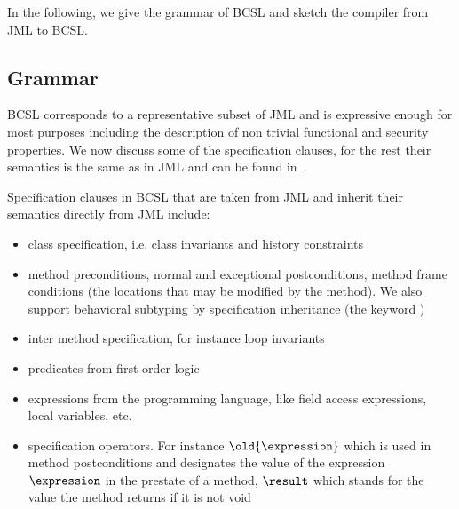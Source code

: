 In the following, we give the grammar of BCSL and sketch the compiler from JML to BCSL. 

\subsection{Grammar} \label{grammar}


BCSL corresponds to a representative subset of JML and is expressive enough for most purposes including the description of non trivial functional and 
 security properties. We now discuss some of the specification clauses, for the rest their semantics is the same as in JML and can be found in~\cite{RT03djml,JMLRefMan}. %

 Specification clauses in BCSL that are taken from JML and inherit their semantics directly from JML include:
\begin{itemize}
   \item class specification, i.e. class invariants and history constraints
   \item  method preconditions, normal and exceptional postconditions, method frame conditions (the locations that may be modified by the method). 
     We also support behavioral subtyping by specification inheritance (the keyword )
   \item inter method specification, for instance loop invariants
   \item predicates from first order logic   
      
\item expressions from the programming language, like field access expressions, local variables, etc.
\item specification operators. For instance  $\old{\expression}$ which is used in method postconditions and
 designates the value of the expression $\expression$ in the prestate of a method, $ \result$ which stands for the value the method
returns if it is not void  
\end{itemize}

